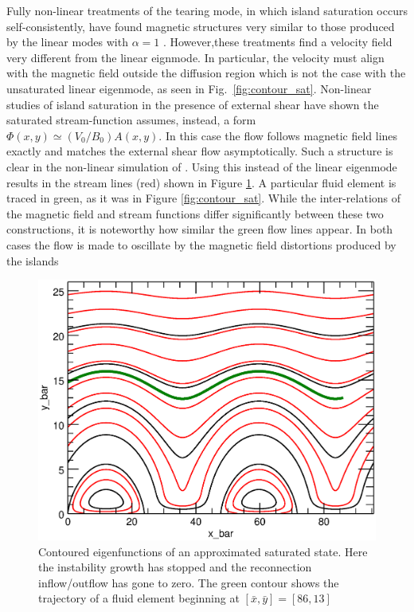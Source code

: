 Fully non-linear treatments of the tearing mode, in which island saturation occurs self-consistently, have found magnetic structures very similar to those produced by the linear modes with $\alpha=1$ \citep{Offman1993,Chen1997,Li2010,Zhang2011,Doss2015}.  However,these treatments find a velocity field very different from the linear eignmode.  In particular, the velocity must align with the magnetic field outside the diffusion region which is not the case with the unsaturated linear eigenmode, as seen in Fig.\ \ref{fig:contour_sat}.   Non-linear studies of island saturation in the presence of external shear have shown the saturated stream-function assumes, instead, a form $\Phi(x,y) \simeq (V_0/ B_0)A(x,y)$.  In this case the flow follows magnetic field lines exactly and matches the  external shear flow asymptotically.  Such a structure is clear in the non-linear simulation of \citet{Offman1993}. Using this instead of the linear eigenmode results in the stream lines (red) shown in Figure \ref{fig:saturated}.  A particular fluid element is traced in green, as it was in Figure \ref{fig:contour_sat}.  While the inter-relations of the magnetic field and stream functions differ significantly between these two constructions, it is noteworthy how similar the green flow lines appear.  In both cases the flow is made to oscillate by the magnetic field distortions produced by the islands 

	\begin{figure}[htbp]  
	
	\caption{Contoured eigenfunctions of an approximated saturated state. Here the instability growth has stopped and the reconnection inflow/outflow has gone to zero. The green contour shows the trajectory of a fluid element beginning at $[\bar{x},\bar{y}]=[86,13]$}
	\centerline{\includegraphics[scale=.8]{ParkerLongcope2017/Ref_Response_1a.eps}}
	\label{fig:saturated}
	\end{figure}
	

